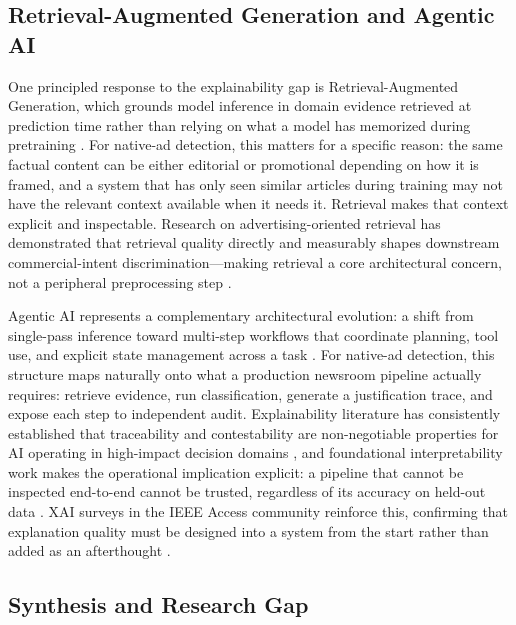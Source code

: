 \documentclass{ieeeaccess}
\begin{document}
\subsection{Retrieval-Augmented Generation and Agentic AI}

One principled response to the explainability gap is Retrieval-Augmented Generation, which grounds model inference in domain evidence retrieved at prediction time rather than relying on what a model has memorized during pretraining \cite{r21}. For native-ad detection, this matters for a specific reason: the same factual content can be either editorial or promotional depending on how it is framed, and a system that has only seen similar articles during training may not have the relevant context available when it needs it. Retrieval makes that context explicit and inspectable. Research on advertising-oriented retrieval has demonstrated that retrieval quality directly and measurably shapes downstream commercial-intent discrimination—making retrieval a core architectural concern, not a peripheral preprocessing step \cite{r20}.

Agentic AI represents a complementary architectural evolution: a shift from single-pass inference toward multi-step workflows that coordinate planning, tool use, and explicit state management across a task \cite{r13}. For native-ad detection, this structure maps naturally onto what a production newsroom pipeline actually requires: retrieve evidence, run classification, generate a justification trace, and expose each step to independent audit. Explainability literature has consistently established that traceability and contestability are non-negotiable properties for AI operating in high-impact decision domains \cite{r11}, and foundational interpretability work makes the operational implication explicit: a pipeline that cannot be inspected end-to-end cannot be trusted, regardless of its accuracy on held-out data \cite{r12}. XAI surveys in the IEEE Access community reinforce this, confirming that explanation quality must be designed into a system from the start rather than added as an afterthought \cite{r29}.

\subsection{Synthesis and Research Gap}
\end{document}
